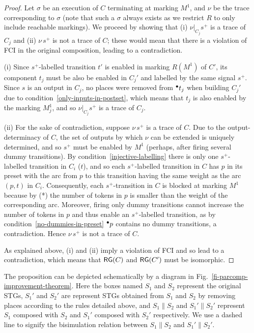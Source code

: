 \begin{proof}
Let $\sigma$ be an execution of $C$ terminating at marking $M^1$,
and $\nu$ be the trace corresponding to $\sigma$ (note that
such a $\sigma$ always exists as we restrict $R$ to only include reachable markings).
We proceed by showing that (i)
$\nu|_{C_j}s^+$ is a trace of $C_j$ and (ii) $\nu\, s^+$ is not
a trace of $C$; these would mean that there is a violation of
FCI in the original composition, leading to a contradiction.

(i) Since $s^+$-labelled transition $t'$ is enabled in marking $R(M^1)$ of $C'$, 
its component $t_j$ must be also be enabled in $C_j'$ and labelled by the same signal $s^+$.
Since $s$ is an output in $C_j$, no places were removed from ${}^\bullet {t_j}$ when building
$C_j'$ due to condition~\ref{only-inputs-in-postset}, which
means that $t_j$ is also enabled by the marking $M^1_j$, and so $\nu|_{C_j}s^+$
is a trace of $C_j$.

(ii) For the sake of contradiction, suppose $\nu\,s^+$ is a
trace of $C$. Due to the output-determinacy of $C$, the set of
outputs by which $\nu$ can be extended is uniquely determined,
and so $s^+$ must be enabled by $M^1$ (perhaps, after firing
several dummy transitions). By
condition~\ref{injective-labelling} there is only one
$s^+$-labelled transition in $C_i$ (\viz $t$), and so each
$s^+$-labelled transition in $C$ has $p$ in its preset with the
arc from $p$ to this transition having the same weight as the
arc $(p,t)$ in $C_i$. Consequently, each $s^+$-transition in
$C$ is blocked at marking $M^1$ because by (*) the number of tokens
in $p$ is smaller than the weight of the corresponding arc.
Moreover, firing only dummy transitions cannot increase the
number of tokens in $p$ and thus enable an $s^+$-labelled
transition, as by condition~\ref{no-dummies-in-preset}
${}^\bullet {p}$ contains no dummy transitions, a contradiction. Hence
$\nu\,s^+$ is not a trace of $C$.

As explained above, (i) and (ii) imply a violation of FCI and
so lead to a contradiction, which means that $\mathsf{RG}(C)$ and
$\mathsf{RG}(C')$ must be isomorphic.


\end{proof}

The proposition can be depicted schematically by a diagram in Fig.~\ref{fi-parcomp-improvement-theorem}.
Here the boxes named $S_1$ and $S_2$ represent the original STGs, 
$S_1'$ and $S_2'$ are represent STGs obtained from $S_1$ and $S_2$ by removing places according to
 the rules detailed above, and $S_1 \parallel S_2$ and $S_1' \parallel S_2'$ represent 
$S_1$ composed with $S_2$ and $S_1'$ composed with $S_2'$ respectively. 
We use a dashed line to signify the bisimulation relation between $S_1 \parallel S_2$ and $S_1' \parallel S_2'$.


